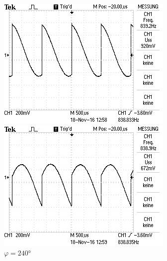 \begin{figure}[!h]
\begin{minipage}[t]{0.3\textwidth}
\includegraphics[width=\textwidth]{Bilder/Rausch165.jpg}
\caption{$\varphi = 165\si{\degree}$}
\label{fig:9}
\end{minipage}
\hspace{10pt}
\vspace{5pt}
\begin{minipage}[t]{0.3\textwidth}
\includegraphics[width=\textwidth]{Bilder/Rausch240.jpg}
\caption{$\varphi = 240\si{\degree}$}
\label{fig:10}
\end{minipage}
\hspace{12pt}
\vspace{5pt}
\begin{minipage}[t]{0.3\textwidth}

\end{minipage}
\end{figure}
